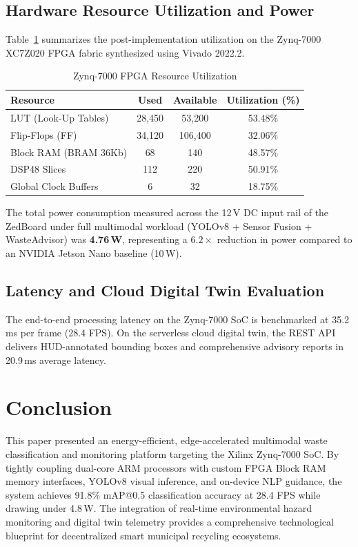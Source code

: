 \documentclass[conference]{IEEEtran}
\begin{document}
\subsection{Hardware Resource Utilization and Power}
Table~\ref{tab:hardware} summarizes the post-implementation utilization on the Zynq-7000 XC7Z020 FPGA fabric synthesized using Vivado 2022.2.

\begin{table}[htbp]
\caption{Zynq-7000 FPGA Resource Utilization}
\label{tab:hardware}
\centering
\begin{tabular}{lccc}
\toprule
\textbf{Resource} & \textbf{Used} & \textbf{Available} & \textbf{Utilization (\%)} \\
\midrule
LUT (Look-Up Tables)   & 28,450 & 53,200  & 53.48\% \\
Flip-Flops (FF)        & 34,120 & 106,400 & 32.06\% \\
Block RAM (BRAM 36Kb)  & 68     & 140     & 48.57\% \\
DSP48 Slices           & 112    & 220     & 50.91\% \\
Global Clock Buffers   & 6      & 32      & 18.75\% \\
\bottomrule
\end{tabular}
\end{table}

The total power consumption measured across the 12\,V DC input rail of the ZedBoard under full multimodal workload (YOLOv8 + Sensor Fusion + WasteAdvisor) was \textbf{4.76\,W}, representing a $6.2\times$ reduction in power compared to an NVIDIA Jetson Nano baseline (10\,W).

\subsection{Latency and Cloud Digital Twin Evaluation}
The end-to-end processing latency on the Zynq-7000 SoC is benchmarked at 35.2\,ms per frame (28.4 FPS). On the serverless cloud digital twin, the REST API delivers HUD-annotated bounding boxes and comprehensive advisory reports in 20.9\,ms average latency.

\section{Conclusion}
This paper presented an energy-efficient, edge-accelerated multimodal waste classification and monitoring platform targeting the Xilinx Zynq-7000 SoC. By tightly coupling dual-core ARM processors with custom FPGA Block RAM memory interfaces, YOLOv8 visual inference, and on-device NLP guidance, the system achieves 91.8\% mAP@0.5 classification accuracy at 28.4 FPS while drawing under 4.8\,W. The integration of real-time environmental hazard monitoring and digital twin telemetry provides a comprehensive technological blueprint for decentralized smart municipal recycling ecosystems.
\end{document}

